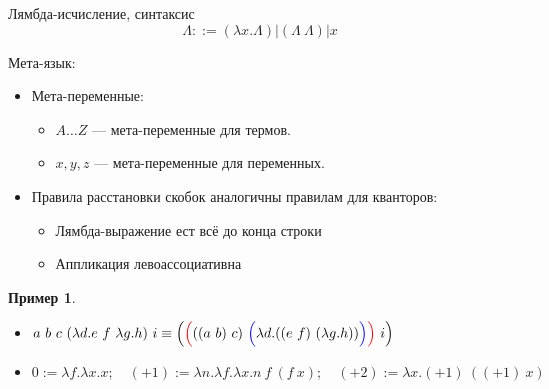 \documentclass[aspectratio=169]{beamer}
\newtheorem{exm}{Пример}[section]
\begin{document}
\begin{frame}{Лямбда-исчисление, синтаксис}
$$\Lambda ::= (\lambda x.\Lambda) | (\Lambda\ \Lambda) | x$$

Мета-язык: 
\begin{itemize}
\item Мета-переменные:\begin{itemize}
\item $A\dots Z$ --- мета-переменные для термов. 
\item $x,y,z$ --- мета-переменные для переменных. 
\end{itemize}

\item Правила расстановки скобок аналогичны правилам для кванторов:
\begin{itemize}
\item Лямбда-выражение ест всё до конца строки
\item Аппликация левоассоциативна
\end{itemize}
\end{itemize}

\begin{exm}
\begin{itemize}
\item $a\ b\ c\ (\lambda d.e\ f\ \lambda g.h)\ i \equiv \Big({\color{red}\Big(}((a\ b)\ c)\ {\color{blue}\Big(}\lambda d.((e\ f)\ (\lambda g.h)){\color{blue}\Big)}{\color{red}\Big)}\ i\Big)$
\item $0 := \lambda f.\lambda x.x;\quad(+1) := \lambda n.\lambda f.\lambda x.n\ f\ (f\ x);\quad(+2) := \lambda x.(+1)\ ((+1)\ x)$
\end{itemize}
\end{exm}
\end{frame}
\end{document}
